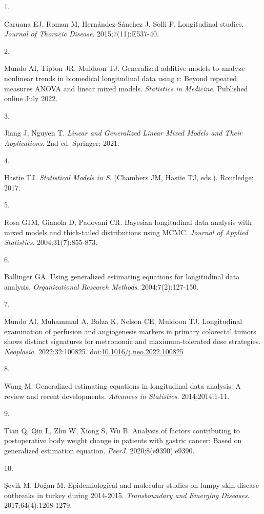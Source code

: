 \documentclass[
]{article}
\newlength{\cslhangindent}
\newlength{\csllabelwidth}
\newlength{\cslentryspacingunit} %
\newenvironment{CSLReferences}[2] %
 {%
  \setlength{\parindent}{0pt}
  \ifodd #1
  \let\oldpar\par
  \def\par{\hangindent=\cslhangindent\oldpar}
  \fi
  \setlength{\parskip}{#2\cslentryspacingunit}
 }%
 {}
\newcommand{\CSLLeftMargin}[1]{\parbox[t]{\csllabelwidth}{#1}}
\newcommand{\CSLRightInline}[1]{\parbox[t]{\linewidth - \csllabelwidth}{#1}\break}
\begin{document}
\hypertarget{refs}{}
\begin{CSLReferences}{0}{0}
\leavevmode{}%
\CSLLeftMargin{1. }%
\CSLRightInline{Caruana EJ, Roman M, Hernández-Sánchez J, Solli P.
Longitudinal studies. \emph{Journal of Thoracic Disease}.
2015;7(11):E537-40.}

\leavevmode{}%
\CSLLeftMargin{2. }%
\CSLRightInline{Mundo AI, Tipton JR, Muldoon TJ. Generalized additive
models to analyze nonlinear trends in biomedical longitudinal data using
r: Beyond repeated measures {ANOVA} and linear mixed models.
\emph{Statistics in Medicine}. Published online July 2022.}

\leavevmode{}%
\CSLLeftMargin{3. }%
\CSLRightInline{Jiang J, Nguyen T. \emph{Linear and Generalized Linear
Mixed Models and Their Applications}. 2nd ed. Springer; 2021.}

\leavevmode{}%
\CSLLeftMargin{4. }%
\CSLRightInline{Hastie TJ. \emph{Statistical Models in {S}}. (Chambers
JM, Hastie TJ, eds.). Routledge; 2017.}

\leavevmode{}%
\CSLLeftMargin{5. }%
\CSLRightInline{Rosa GJM, Gianola D, Padovani CR. Bayesian longitudinal
data analysis with mixed models and thick-tailed distributions using
{MCMC}. \emph{Journal of Applied Statistics}. 2004;31(7):855-873.}

\leavevmode{}%
\CSLLeftMargin{6. }%
\CSLRightInline{Ballinger GA. Using generalized estimating equations for
longitudinal data analysis. \emph{Organizational Research Methods}.
2004;7(2):127-150.}

\leavevmode{}%
\CSLLeftMargin{7. }%
\CSLRightInline{Mundo AI, Muhammad A, Balza K, Nelson CE, Muldoon TJ.
Longitudinal examination of perfusion and angiogenesis markers in
primary colorectal tumors shows distinct signatures for metronomic and
maximum-tolerated dose strategies. \emph{Neoplasia}. 2022;32:100825.
doi:\href{https://doi.org/10.1016/j.neo.2022.100825}{10.1016/j.neo.2022.100825}}

\leavevmode{}%
\CSLLeftMargin{8. }%
\CSLRightInline{Wang M. Generalized estimating equations in longitudinal
data analysis: A review and recent developments. \emph{Advances in
Statistics}. 2014;2014:1-11.}

\leavevmode{}%
\CSLLeftMargin{9. }%
\CSLRightInline{Tian Q, Qin L, Zhu W, Xiong S, Wu B. Analysis of factors
contributing to postoperative body weight change in patients with
gastric cancer: Based on generalized estimation equation. \emph{PeerJ}.
2020;8(e9390):e9390.}

\leavevmode{}%
\CSLLeftMargin{10. }%
\CSLRightInline{Şevik M, Doğan M. Epidemiological and molecular studies
on lumpy skin disease outbreaks in turkey during 2014-2015.
\emph{Transboundary and Emerging Diseases}. 2017;64(4):1268-1279.}

\end{CSLReferences}
\end{document}

